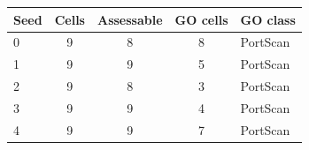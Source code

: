 \begin{tabular}{lcccl}
\toprule
Seed & Cells & Assessable & GO cells & GO class \\
\midrule
0 & 9 & 8 & 8 & PortScan \\
1 & 9 & 9 & 5 & PortScan \\
2 & 9 & 8 & 3 & PortScan \\
3 & 9 & 9 & 4 & PortScan \\
4 & 9 & 9 & 7 & PortScan \\
\bottomrule
\end{tabular}
